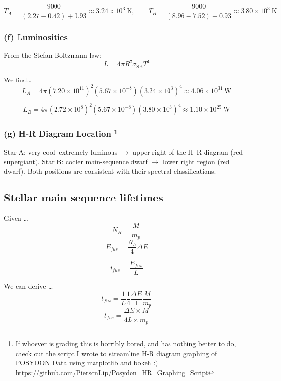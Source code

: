\documentclass{article}
\begin{document}
\[
T_A = \frac{9000}{(2.27 - 0.42) + 0.93} \boxed{\approx 3.24\times10^{3}~\mathrm{K}}, \qquad
T_B = \frac{9000}{(8.96 - 7.52) + 0.93} \boxed{\approx 3.80\times10^{3}~\mathrm{K}}
\]

\subsubsection*{(f) Luminosities}

From the Stefan-Boltzmann law:
\[
L = 4\pi R^2\sigma_\mathrm{SB}T^4
\]

We find\dots
\[
L_A = 4\pi(7.20\times10^{11})^2(5.67\times10^{-8})(3.24\times10^{3})^4
     \boxed{\approx 4.06\times10^{31}~\mathrm{W}}
\]

\[
L_B = 4\pi(2.72\times10^{8})^2(5.67\times10^{-8})(3.80\times10^{3})^4
    \boxed{ \approx 1.10\times10^{25}~\mathrm{W}}
\]

\subsubsection*{(g) H-R Diagram Location \footnote{If whoever is grading this is horribly bored, and has nothing better to do, check out the script I wrote to streamline H-R diagram graphing of POSYDON Data using matplotlib and bokeh :) \url{https://github.com/PiersonLip/Posydon_HR_Graphing_Script} }}

Star A: very cool, extremely luminous $\rightarrow$ upper right of the H–R diagram (red supergiant).  
Star B: cooler main-sequence dwarf $\rightarrow$ lower right region (red dwarf).  
Both positions are consistent with their spectral classifications.


\subsection{Stellar main sequence lifetimes}
Given \dots
\begin{equation}
    N_H = \frac{M}{m_p} 
    \tag{15.52}
\end{equation}
\begin{equation}
    E_{fus} = \frac{N_h}{4}\Delta E
    \tag{15.53}
\end{equation}

\begin{equation}
    t_{fus} = \frac{E_{fus}}{L}
    \tag{15.54}
\end{equation}

We can derive \dots
    \[t_{fus} = \frac{1}{L} \frac{1}{4} \frac{\Delta E}{1} \frac{M}{m_p}\]
    \[t_{fus} = \frac{\Delta E \times M}{4L\times m_p}\]
\end{document}

